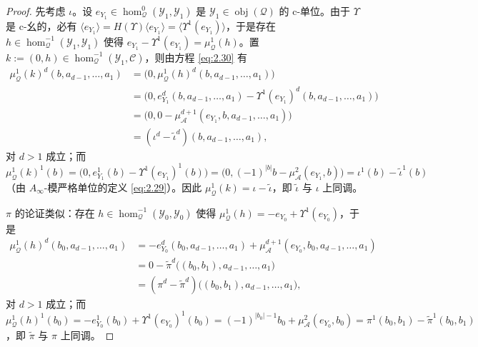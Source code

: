 \begin{proof}
先考虑 $\iota$。设 $e_{Y_1}\in\hom^0_{\mathcal Q}(\mathcal Y_1,\mathcal Y_1)$
是 $\mathcal Y_1\in\operatorname{obj}(\mathcal Q)$ 的 c-单位。由于 $\Upsilon$
是 c-幺的，必有 $\langle e_{Y_1}\rangle=H(\Upsilon)\langle e_{Y_1}\rangle=
\langle\Upsilon^1(e_{Y_1})\rangle$，于是存在
$h\in\hom^{-1}_{\mathcal Q}(\mathcal Y_1,\mathcal Y_1)$ 使得
$e_{Y_1}-\Upsilon^1(e_{Y_1})=\mu^1_{\mathcal Q}(h)$。置
$k:=(0,h)\in\hom^{-1}_{\mathcal Q}(\mathcal Y_1,\mathcal C)$，则由方程
\eqref{eq:2.30} 有
\[
  \begin{aligned}
    \mu^1_{\mathcal Q}(k)^d(b,a_{d-1},\dots,a_1)
    &=\bigl(0,\mu^1_{\mathcal Q}(h)^d(b,a_{d-1},\dots,a_1)\bigr)\\
    &=\bigl(0,e^d_{Y_1}(b,a_{d-1},\dots,a_1)-
    \Upsilon^1(e_{Y_1})^d(b,a_{d-1},\dots,a_1)\bigr)\\
    &=\bigl(0,0-\mu^{d+1}_{\mathcal A}(e_{Y_1},b,a_{d-1},\dots,a_1)\bigr)\\
    &=(\iota^d-\tilde\iota^d)(b,a_{d-1},\dots,a_1),
  \end{aligned}
\]
对 $d>1$ 成立；而
$\mu^1_{\mathcal Q}(k)^1(b)=\bigl(0,e^1_{Y_1}(b)-\Upsilon^1(e_{Y_1})^1(b)\bigr)
=\bigl(0,(-1)^{|b|}b-\mu^2_{\mathcal A}(e_{Y_1},b)\bigr)=\iota^1(b)-
\tilde\iota^1(b)$（由 $A_\infty$-模严格单位的定义 \eqref{eq:2.29}）。因此
$\mu^1_{\mathcal Q}(k)=\iota-\tilde\iota$，即 $\tilde\iota$ 与 $\iota$ 上同调。

$\pi$ 的论证类似：存在 $h\in\hom^{-1}_{\mathcal Q}(\mathcal Y_0,\mathcal Y_0)$
使得 $\mu^1_{\mathcal Q}(h)=-e_{Y_0}+\Upsilon^1(e_{Y_0})$，于是
\[
  \begin{aligned}
    \mu^1_{\mathcal Q}(h)^d(b_0,a_{d-1},\dots,a_1)
    &=-e^d_{Y_0}(b_0,a_{d-1},\dots,a_1)+
    \mu^{d+1}_{\mathcal A}(e_{Y_0},b_0,a_{d-1},\dots,a_1)\\
    &=0-\tilde\pi^d\bigl((b_0,b_1),a_{d-1},\dots,a_1\bigr)\\
    &=(\pi^d-\tilde\pi^d)\bigl((b_0,b_1),a_{d-1},\dots,a_1\bigr),
  \end{aligned}
\]
对 $d>1$ 成立；而
$\mu^1_{\mathcal Q}(h)^1(b_0)=-e^1_{Y_0}(b_0)+\Upsilon^1(e_{Y_0})^1(b_0)
=(-1)^{|b_0|-1}b_0+\mu^2_{\mathcal A}(e_{Y_0},b_0)=\pi^1(b_0,b_1)-
\tilde\pi^1(b_0,b_1)$，即 $\tilde\pi$ 与 $\pi$ 上同调。
\end{proof}

